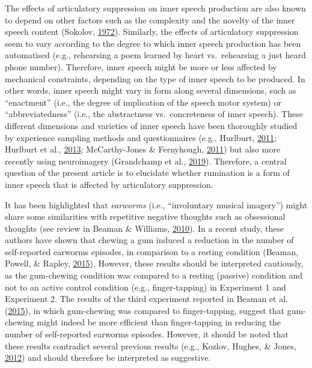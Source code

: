 \documentclass[a4paper,12pt,twoside,onecolumn,openright,final,oldfontcommands]{memoir}
\begin{document}
The effects of articulatory suppression on inner speech production are also known to depend on other factors such as the complexity and the novelty of the inner speech content (Sokolov, \protect\hyperlink{ref-sokolov_inner_1972}{1972}). Similarly, the effects of articulatory suppression seem to vary according to the degree to which inner speech production has been automatised (e.g., rehearsing a poem learned by heart vs.~rehearsing a just heard phone number). Therefore, inner speech might be more or less affected by mechanical constraints, depending on the type of inner speech to be produced. In other words, inner speech might vary in form along several dimensions, such as \enquote{enactment} (i.e., the degree of implication of the speech motor system) or \enquote{abbreviatedness} (i.e., the abstractness vs.~concreteness of inner speech). These different dimensions and varieties of inner speech have been thoroughly studied by experience sampling methods and questionnaires (e.g., Hurlburt, \protect\hyperlink{ref-Hurlburt2011}{2011}; Hurlburt et al., \protect\hyperlink{ref-Hurlburt2013}{2013}; McCarthy-Jones \& Fernyhough, \protect\hyperlink{ref-McCarthy-Jones2011}{2011}) but also more recently using neuroimagery (Grandchamp et al., \protect\hyperlink{ref-grandchamp_neurocognitive_2019}{2019}). Therefore, a central question of the present article is to elucidate whether rumination is a form of inner speech that is affected by articulatory suppression.

It has been highlighted that \emph{earworms} (i.e., \enquote{involuntary musical imagery}) might share some similarities with repetitive negative thoughts such as obsessional thoughts (see review in Beaman \& Williams, \protect\hyperlink{ref-Beaman2010}{2010}). In a recent study, these authors have shown that chewing a gum induced a reduction in the number of self-reported earworms episodes, in comparison to a resting condition (Beaman, Powell, \& Rapley, \protect\hyperlink{ref-Beaman2015}{2015}). However, these results should be interpreted cautiously, as the gum-chewing condition was compared to a resting (passive) condition and not to an active control condition (e.g., finger-tapping) in Experiment 1 and Experiment 2. The results of the third experiment reported in Beaman et al. (\protect\hyperlink{ref-Beaman2015}{2015}), in which gum-chewing was compared to finger-tapping, suggest that gum-chewing might indeed be more efficient than finger-tapping in reducing the number of self-reported earworms episodes. However, it should be noted that these results contradict several previous results (e.g., Kozlov, Hughes, \& Jones, \protect\hyperlink{ref-kozlov_gummed-up_2012}{2012}) and should therefore be interpreted as suggestive.
\end{document}

